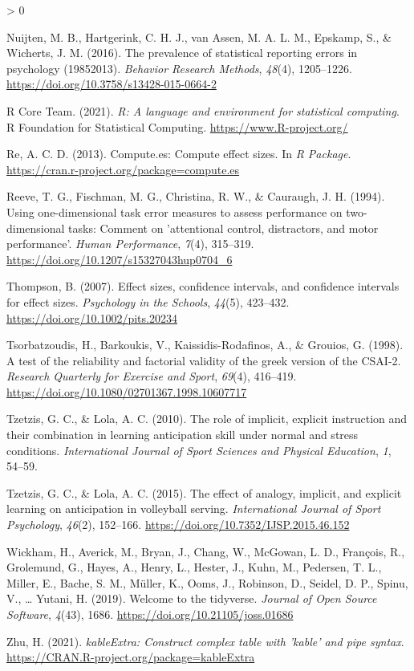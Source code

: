 \documentclass[
  english,
  man,floatsintext]{apa7}
\newlength{\cslhangindent}
\newenvironment{CSLReferences}[2] %
 {%
  \setlength{\parindent}{0pt}
  \ifodd #1 \everypar{\setlength{\hangindent}{\cslhangindent}}\ignorespaces\fi
  \ifnum #2 > 0
  \setlength{\parskip}{#2\baselineskip}
  \fi
 }%
 {}
\begin{document}
\begin{CSLReferences}{1}{0}
\leavevmode\hypertarget{ref-nuijten2016}{}%
Nuijten, M. B., Hartgerink, C. H. J., van Assen, M. A. L. M., Epskamp, S., \& Wicherts, J. M. (2016). The prevalence of statistical reporting errors in psychology (1985{{}}2013). \emph{Behavior Research Methods}, \emph{48}(4), 1205--1226. \url{https://doi.org/10.3758/s13428-015-0664-2}

\leavevmode\hypertarget{ref-R-base}{}%
R Core Team. (2021). \emph{R: A language and environment for statistical computing}. R Foundation for Statistical Computing. \url{https://www.R-project.org/}

\leavevmode\hypertarget{ref-R-compute.es}{}%
Re, A. C. D. (2013). Compute.es: Compute effect sizes. In \emph{R Package}. \url{https://cran.r-project.org/package=compute.es}

\leavevmode\hypertarget{ref-reeve1994}{}%
Reeve, T. G., Fischman, M. G., Christina, R. W., \& Cauraugh, J. H. (1994). Using one-dimensional task error measures to assess performance on two-dimensional tasks: Comment on 'attentional control, distractors, and motor performance'. \emph{Human Performance}, \emph{7}(4), 315--319. \url{https://doi.org/10.1207/s15327043hup0704_6}

\leavevmode\hypertarget{ref-thompson2007}{}%
Thompson, B. (2007). Effect sizes, confidence intervals, and confidence intervals for effect sizes. \emph{Psychology in the Schools}, \emph{44}(5), 423--432. \url{https://doi.org/10.1002/pits.20234}

\leavevmode\hypertarget{ref-tsorbatzoudis1998}{}%
Tsorbatzoudis, H., Barkoukis, V., Kaissidis-Rodafinos, A., \& Grouios, G. (1998). A test of the reliability and factorial validity of the greek version of the CSAI-2. \emph{Research Quarterly for Exercise and Sport}, \emph{69}(4), 416--419. \url{https://doi.org/10.1080/02701367.1998.10607717}

\leavevmode\hypertarget{ref-tzetzis2010}{}%
Tzetzis, G. C., \& Lola, A. C. (2010). The role of implicit, explicit instruction and their combination in learning anticipation skill under normal and stress conditions. \emph{International Journal of Sport Sciences and Physical Education}, \emph{1}, 54--59.

\leavevmode\hypertarget{ref-tzetzis2015}{}%
Tzetzis, G. C., \& Lola, A. C. (2015). The effect of analogy, implicit, and explicit learning on anticipation in volleyball serving. \emph{International Journal of Sport Psychology}, \emph{46}(2), 152--166. \url{https://doi.org/10.7352/IJSP.2015.46.152}

\leavevmode\hypertarget{ref-R-tidyverse}{}%
Wickham, H., Averick, M., Bryan, J., Chang, W., McGowan, L. D., François, R., Grolemund, G., Hayes, A., Henry, L., Hester, J., Kuhn, M., Pedersen, T. L., Miller, E., Bache, S. M., Müller, K., Ooms, J., Robinson, D., Seidel, D. P., Spinu, V., \ldots{} Yutani, H. (2019). Welcome to the {tidyverse}. \emph{Journal of Open Source Software}, \emph{4}(43), 1686. \url{https://doi.org/10.21105/joss.01686}

\leavevmode\hypertarget{ref-R-kableExtra}{}%
Zhu, H. (2021). \emph{kableExtra: Construct complex table with 'kable' and pipe syntax}. \url{https://CRAN.R-project.org/package=kableExtra}

\end{CSLReferences}
\end{document}
